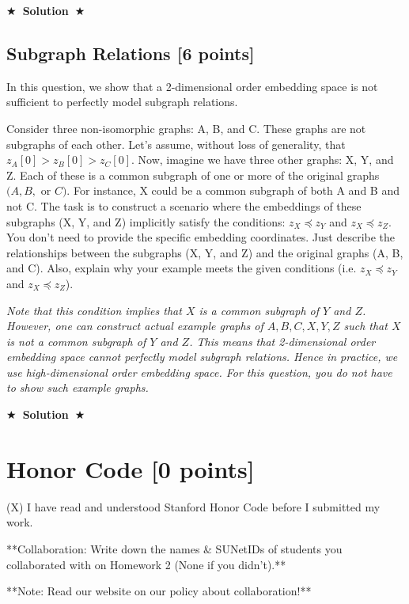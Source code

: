 \documentclass[11pt]{article}
\numberwithin{figure}{section}
\newcommand{\Solution}[1]{{\medskip \color{red} \bf $\bigstar$~\sf \textbf{Solution}~$\bigstar$ \sf #1 } \bigskip}
\begin{document}
\Solution{}

\subsection{Subgraph Relations [6 points]}
In this question, we show that a 2-dimensional order embedding space is not sufficient to perfectly model subgraph relations.

Consider three non-isomorphic graphs: A, B, and C. These graphs are not subgraphs of each other. Let’s assume,  without loss of generality, that $z_A[0] > z_B[0] >z_C [0]$.
Now, imagine we have three other graphs: X, Y, and Z. Each of these is a common subgraph of one or more of the original graphs $(A, B, $ or $C)$. For instance, X could be a common subgraph of both A and B and not C. The task is to construct a scenario where the embeddings of these subgraphs (X, Y, and Z) implicitly satisfy the conditions: $z_X \preccurlyeq z_Y$ and $z_X \preccurlyeq z_Z$.
You don’t need to provide the specific embedding coordinates. Just describe the relationships between the subgraphs (X, Y, and Z) and the original graphs (A, B, and C). Also, explain why your example meets the given conditions (i.e. $z_X \preccurlyeq z_Y$ and $z_X \preccurlyeq z_Z$).


\textit{Note that this condition implies that $X$ is a common subgraph of $Y$ and $Z$. However, one can construct actual example graphs of $A, B, C, X, Y, Z$ such that $X$ is not a common subgraph of $Y$ and $Z$. This means that 2-dimensional order embedding space cannot perfectly model subgraph relations. Hence in practice, we use high-dimensional order embedding space. For this question, you do not have to show such example graphs.}

\Solution{}

\newpage

\section{Honor Code [0 points]}
(X) I have read and understood Stanford Honor Code before I submitted my
work.

**Collaboration: Write down the names \& SUNetIDs of students you collaborated with on Homework 2 (None if you didn’t).**

**Note: Read our website on our policy about collaboration!**
\end{document}
